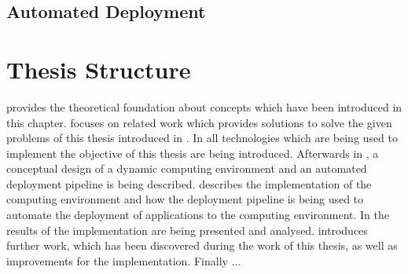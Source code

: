 \subsection{Automated Deployment}












\section{Thesis Structure}
 provides the theoretical foundation about concepts which have been introduced in this chapter.
 focuses on related work which provides solutions to solve the given problems of this thesis introduced in .
In  all technologies which are being used to implement the objective of this thesis are being introduced.
Afterwards in , a conceptual design of a dynamic computing environment and an automated deployment pipeline is being described.
 describes the implementation of the computing environment and how the deployment pipeline is being used to automate the deployment of applications to the computing environment.
In  the results of the implementation are being presented and analysed.
 introduces further work, which has been discovered during the work of this thesis, as well as improvements for the implementation.
Finally  ...


